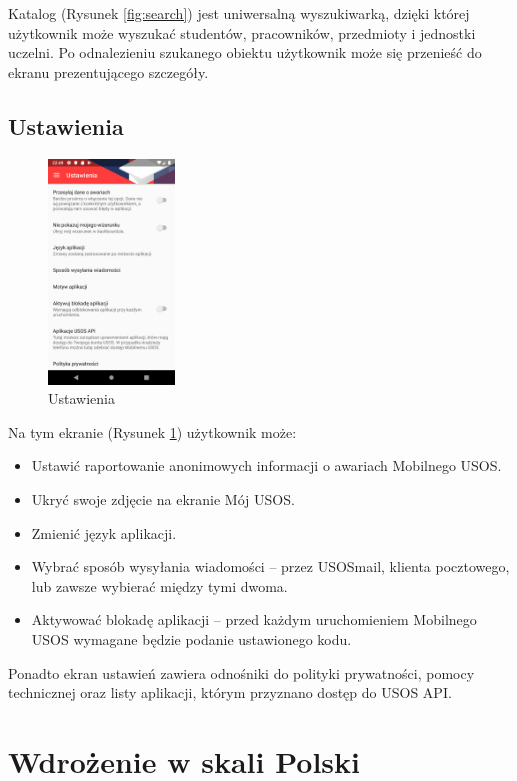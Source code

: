 \documentclass{pracamgr}
\begin{document}
Katalog (Rysunek \ref{fig:search}) jest uniwersalną wyszukiwarką, dzięki której użytkownik może wyszukać
studentów, pracowników, przedmioty i jednostki uczelni. Po odnalezieniu szukanego
obiektu użytkownik może się przenieść do ekranu prezentującego szczegóły.

\section{Ustawienia}

\begin{figure}[p]
	\centering
	\includegraphics[width=0.3\textwidth]{img/settings.png}
	\caption{Ustawienia}\label{fig:settings}
	\medskip
\end{figure}

Na tym ekranie (Rysunek \ref{fig:settings}) użytkownik może:

\begin{itemize}
	\item Ustawić raportowanie anonimowych informacji o awariach Mobilnego USOS.
	\item Ukryć swoje zdjęcie na ekranie Mój USOS.
	\item Zmienić język aplikacji.
	\item Wybrać sposób wysyłania wiadomości -- przez USOSmail, klienta pocztowego,
	lub zawsze wybierać między tymi dwoma.
	\item Aktywować blokadę aplikacji -- przed każdym uruchomieniem Mobilnego USOS
	wymagane będzie podanie ustawionego kodu.
\end{itemize}

Ponadto ekran ustawień zawiera odnośniki do polityki prywatności, pomocy technicznej
oraz listy aplikacji, którym przyznano dostęp do USOS API.

\chapter{Wdrożenie w skali Polski}
\label{sec:wdrozenie}
\end{document}
